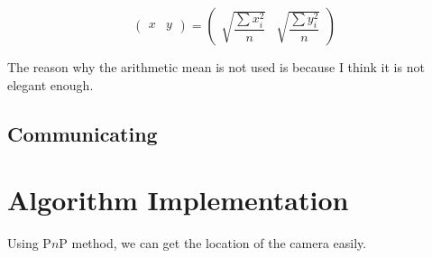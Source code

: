 \documentclass{article}
\begin{document}
\[
  \left(\begin{matrix}x&y\end{matrix}\right)=\left(\begin{matrix}\sqrt{\dfrac{\sum x_i^2}{n}}&\sqrt{\dfrac{\sum y_i^2}{n}}\end{matrix}\right)
\]

The reason why the arithmetic mean is not used is because I think it is not elegant enough.

\subsection{Communicating}

\section{Algorithm Implementation}

Using P$n$P method, we can get the location of the camera easily.
\end{document}
